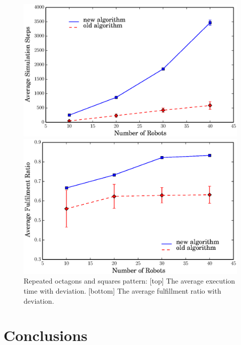   \begin{figure}
    \begin{minipage}[b]{0.9\linewidth}
      \includegraphics[trim=0.5cm 0cm 1.5cm 0,clip=true,width=\linewidth]{figs/steps_octagon_square}
    \end{minipage}
    \begin{minipage}[b]{0.9\linewidth}
      \includegraphics[trim=0.5cm 0 1.5cm 0,clip=true,width=\linewidth]{figs/ratio_octagon_square}
    \end{minipage}
    \caption{Repeated octagons and squares pattern: [top] The average execution time with deviation. [bottom] The average fulfillment ratio with deviation.}
    \label{fig:octsq_comp}
  \end{figure}
  
\section{Conclusions}
\label{sec:conc-mrf2}

